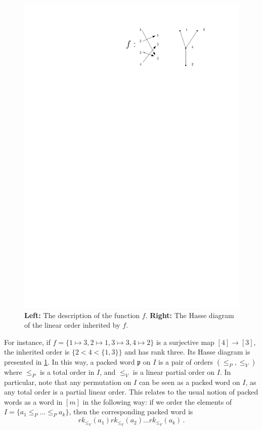 \documentclass[12pt, reqno]{amsart}
\theoremstyle{definition}
\begin{document}
\begin{figure}[h]
	\centering
	\includegraphics[scale=1]{images/packedWordOrder.pdf}
	\caption{\textbf{Left:} The description of the function $f$. \textbf{Right:} The Hasse diagram of the linear order inherited by $f$. \label{fig:packedWordOrder}}
\end{figure}

For instance, if $f = \{ 1\mapsto 3, 2\mapsto 1, 3\mapsto 3, 4\mapsto 2\}$ is a surjective map $[4]\to[3]$, the inherited order is $\{2 < 4 < \{1, 3  \}\}$ and has rank three.
Its Hasse diagram is presented in \cref{fig:packedWordOrder}.
In this way, a packed word $\mathfrak{p}$ on $I$ is a pair of orders $(\leq_P, \leq_V)$ where $\leq_P$ is a total order in $I$, and $\leq_V$ is a linear partial order on $I$.
In particular, note that any permutation on $I$ can be seen as a packed word on $I$, as any total order is a partial linear order.
This relates to the usual notion of packed words as a word in $[m]$ in the following way:
if we order the elements of $I = \{a_1 \leq_P \dots \leq_P a_k \}$, then the corresponding packed word is 
$$rk_{\leq_V}(a_1)rk_{\leq_V}(a_2) \dots rk_{\leq_V}(a_k) \, .$$
\end{document}
